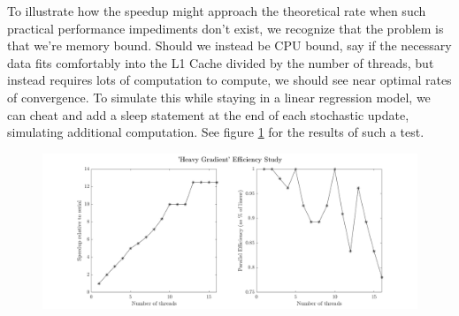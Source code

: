 To illustrate how the speedup might approach the theoretical rate when such
practical performance impediments don't exist, we recognize that the problem is
that we're memory bound. Should we instead be CPU bound, say if the necessary
data fits comfortably into the L1 Cache divided by the number of threads, but
instead requires lots of computation to compute, we should see near optimal
rates of convergence. To simulate this while staying in a linear regression
model, we can cheat and add a sleep statement at the end of each stochastic
update, simulating additional computation. See figure \ref{fig:heavygrad} for
the results of such a test.
\begin{figure}[!htb]
  \centering
  \includegraphics[width=\textwidth]{./resources/heavy_gradient}
  \caption{
  } \label{fig:heavygrad}
\end{figure}
